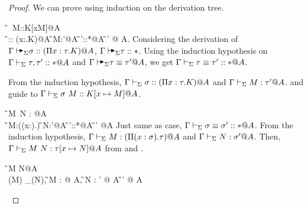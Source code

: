 \begin{proof}
    We can prove using induction on the derivation tree.
    \begin{rneqncase}{\KAApp{}}{
            \G\AVS \sigma\ M::K[x\mapsto M]@A \\
            \G\AVS \sigma:: (\Pi x:\tau.K)@A \text{ , }
            \G\AVS M:\tau'@A \text{ , } 
            \G\AVS\tau'::*@A  
            \G\AVS \tau \E \tau' @ A.
        }
        Considering the derivation of \( \G\AVS \sigma:: (\Pi x:\tau.K)@A \), \( \G \AVS \tau::* \).
        Using the induction hypothesis on \( \Gamma \vdash_\Sigma \tau, \tau'::* @ A \) and \( \G\AVS \tau \E \tau' @ A \),
        we get \( \Gamma\vdash_\Sigma \tau \equiv \tau' :: * @ A \).

        From the induction hypothesis, \( \Gamma\vdash_\Sigma \sigma:: (\Pi x:\tau.K)@A \) and \( \Gamma\vdash_\Sigma M:\tau'@A \).
        \TConv and \KApp guide to \( \G\V \sigma\ M::K[x\mapsto M]@A \).

    \end{rneqncase}
    \begin{rneqncase}{\TAApp}{
            \G\AVS M\ N : \tau[x\mapsto N]@A \\
            \G\AVS M:(\Pi (x:\sigma).\tau) \text{ , }
            \G\AVS N:\sigma'@A \text{ , }
            \G\AVS \sigma'::*@A 
            \G\AVS \sigma\E\sigma' @A
        }
        Just same as \KApp case, \( \Gamma\vdash_\Sigma \sigma\equiv\sigma' :: * @A \).
        From the induction hypothesis, \( \Gamma\vdash_\Sigma M:(\Pi (x:\sigma).\tau) @ A\) and \( \Gamma\vdash_\Sigma N:\sigma'@A \).
        Then, \( \Gamma\vdash_\Sigma M\ N : \tau[x\mapsto N]@A \) from \TConv and \TApp.
    \end{rneqncase}
    \begin{rneqncase}{\QAANF}{
            \G \AV M \E N@A
             \\
            \ANF(M) \E_\alpha \ANF(N),
            \G \AVS M : \tau @ A,
            \G \AVS N : \tau' @ A 
            \G \AVS \tau \E \tau' @ A
        }
    \end{rneqncase}
\end{proof}


